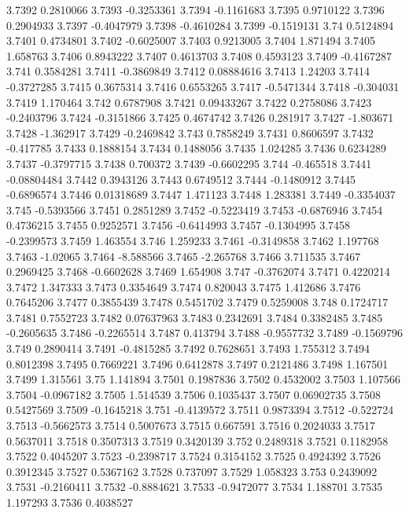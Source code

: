 3.7392  0.2810066
3.7393  -0.3253361
3.7394  -0.1161683
3.7395  0.9710122
3.7396  0.2904933
3.7397  -0.4047979
3.7398  -0.4610284
3.7399  -0.1519131
3.74  0.5124894
3.7401  0.4734801
3.7402  -0.6025007
3.7403  0.9213005
3.7404  1.871494
3.7405  1.658763
3.7406  0.8943222
3.7407  0.4613703
3.7408  0.4593123
3.7409  -0.4167287
3.741  0.3584281
3.7411  -0.3869849
3.7412  0.08884616
3.7413  1.24203
3.7414  -0.3727285
3.7415  0.3675314
3.7416  0.6553265
3.7417  -0.5471344
3.7418  -0.304031
3.7419  1.170464
3.742  0.6787908
3.7421  0.09433267
3.7422  0.2758086
3.7423  -0.2403796
3.7424  -0.3151866
3.7425  0.4674742
3.7426  0.281917
3.7427  -1.803671
3.7428  -1.362917
3.7429  -0.2469842
3.743  0.7858249
3.7431  0.8606597
3.7432  -0.417785
3.7433  0.1888154
3.7434  0.1488056
3.7435  1.024285
3.7436  0.6234289
3.7437  -0.3797715
3.7438  0.700372
3.7439  -0.6602295
3.744  -0.465518
3.7441  -0.08804484
3.7442  0.3943126
3.7443  0.6749512
3.7444  -0.1480912
3.7445  -0.6896574
3.7446  0.01318689
3.7447  1.471123
3.7448  1.283381
3.7449  -0.3354037
3.745  -0.5393566
3.7451  0.2851289
3.7452  -0.5223419
3.7453  -0.6876946
3.7454  0.4736215
3.7455  0.9252571
3.7456  -0.6414993
3.7457  -0.1304995
3.7458  -0.2399573
3.7459  1.463554
3.746  1.259233
3.7461  -0.3149858
3.7462  1.197768
3.7463  -1.02065
3.7464  -8.588566
3.7465  -2.265768
3.7466  3.711535
3.7467  0.2969425
3.7468  -0.6602628
3.7469  1.654908
3.747  -0.3762074
3.7471  0.4220214
3.7472  1.347333
3.7473  0.3354649
3.7474  0.820043
3.7475  1.412686
3.7476  0.7645206
3.7477  0.3855439
3.7478  0.5451702
3.7479  0.5259008
3.748  0.1724717
3.7481  0.7552723
3.7482  0.07637963
3.7483  0.2342691
3.7484  0.3382485
3.7485  -0.2605635
3.7486  -0.2265514
3.7487  0.413794
3.7488  -0.9557732
3.7489  -0.1569796
3.749  0.2890414
3.7491  -0.4815285
3.7492  0.7628651
3.7493  1.755312
3.7494  0.8012398
3.7495  0.7669221
3.7496  0.6412878
3.7497  0.2121486
3.7498  1.167501
3.7499  1.315561
3.75  1.141894
3.7501  0.1987836
3.7502  0.4532002
3.7503  1.107566
3.7504  -0.0967182
3.7505  1.514539
3.7506  0.1035437
3.7507  0.06902735
3.7508  0.5427569
3.7509  -0.1645218
3.751  -0.4139572
3.7511  0.9873394
3.7512  -0.522724
3.7513  -0.5662573
3.7514  0.5007673
3.7515  0.667591
3.7516  0.2024033
3.7517  0.5637011
3.7518  0.3507313
3.7519  0.3420139
3.752  0.2489318
3.7521  0.1182958
3.7522  0.4045207
3.7523  -0.2398717
3.7524  0.3154152
3.7525  0.4924392
3.7526  0.3912345
3.7527  0.5367162
3.7528  0.737097
3.7529  1.058323
3.753  0.2439092
3.7531  -0.2160411
3.7532  -0.8884621
3.7533  -0.9472077
3.7534  1.188701
3.7535  1.197293
3.7536  0.4038527
